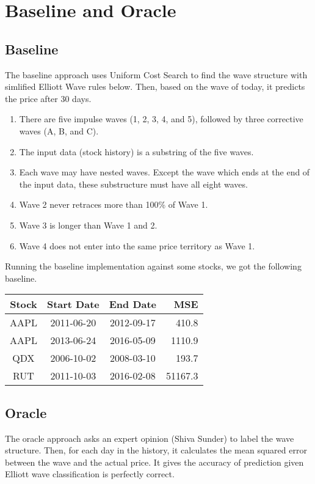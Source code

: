 \documentclass[12pt]{article}
\begin{document}
\section{Baseline and Oracle}

\subsection{Baseline}

The baseline approach uses Uniform Cost Search to find the wave
structure with simlified Elliott Wave rules below. Then, based on the
wave of today, it predicts the price after 30 days.

\begin{enumerate}
 \item There are five impulse waves (1, 2, 3, 4, and 5), followed by
   three corrective waves (A, B, and C).
 \item The input data (stock history) is a substring of the five waves.
 \item Each wave may have nested waves. Except the wave which ends at the end of the input data, these substructure must have all eight waves.
 \item Wave 2 never retraces more than 100\% of Wave 1.
 \item Wave 3 is longer than Wave 1 and 2. 
 \item Wave 4 does not enter into the same price territory as Wave 1.
\end{enumerate}

Running the baseline implementation against some stocks, we got the following baseline.

\begin{tabular}{cccr}
  Stock & Start Date & End Date & MSE \\
  \hline
  AAPL & 2011-06-20 & 2012-09-17 & 410.8 \\
  AAPL & 2013-06-24 & 2016-05-09 & 1110.9 \\
  QDX  & 2006-10-02 & 2008-03-10 & 193.7 \\
  RUT  & 2011-10-03 & 2016-02-08 & 51167.3 \\
\end{tabular}

\subsection{Oracle}

The oracle approach asks an expert opinion (Shiva Sunder) to label the
wave structure. Then, for each day in the history, it calculates the
mean squared error between the wave and the actual price. It gives the
accuracy of prediction given Elliott wave classification is perfectly
correct.
\end{document}
